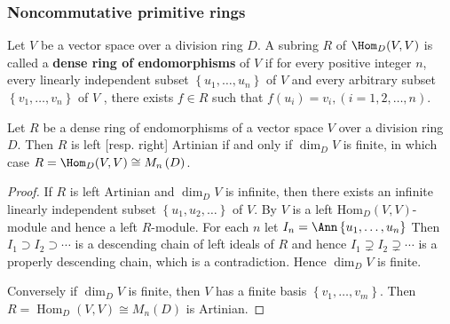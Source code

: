 \subsubsection{Noncommutative primitive rings} %
\begin{definition}
    Let $V$ be a vector space over a division ring $D$.
    A subring $R$ of $\Hom_{D}(V, V)$ is called a \textbf{dense ring of endomorphisms} of $V$ if for every positive integer $n$, every linearly independent subset $\left\{u_1, \ldots, u_{n}\right\}$ of $V$ and every arbitrary subset $\left\{v_1, \ldots, v_{n}\right\}$ of $V$ , there exists $f \in R$ such that $f\left(u_{i}\right)=v_{i}, (i=1,2, \ldots, n)$.
\end{definition}


\begin{theorem}
    \label{thm: Dense ring of endomorphisms of a finite dimensional vector space}
    Let $R$ be a dense ring of endomorphisms of a vector space $V$ over a division ring $D$.
    Then $R$ is left [resp. right] Artinian if and only if $\operatorname{dim}_{D} V$ is finite, in which case $R=\Hom_{D}(V, V)\cong M_n\left(D\right)$.

    \begin{proof}
        If $R$ is left Artinian and $\operatorname{dim}_D V$ is infinite, then there exists an infinite linearly independent subset $\left\{u_1, u_2, \ldots\right\}$ of $V$. By  $V$ is a left $\mathrm{Hom}_D(V, V)$-module and hence a left $R$-module. For each $n$ let $I_n=\Ann\left\{u_1, \ldots, u_n\right\}$
        Then $I_1 \supset I_2 \supset \cdots$ is a descending chain of left ideals of $R$ and hence $I_1\supsetneq I_2\supsetneq\cdots$ is a properly descending chain, which is a contradiction. Hence $\dim_D V$ is finite.

        Conversely if $\operatorname{dim}_D V$ is finite, then $V$ has a finite basis $\left\{v_1, \ldots, v_m\right\}$. Then $R= \operatorname{Hom}_D(V, V)\cong M_n\left(D\right) $ is Artinian.
    \end{proof}
\end{theorem}


